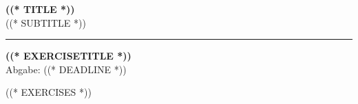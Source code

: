 \documentclass[11pt,a4paper]{article}
\begin{document}
\pagestyle{empty}

\mbox{}\vspace{-1.8cm}
\noindent    

{\Large\bfseries
((* TITLE *))}\\
((* SUBTITLE *))
\vspace{2mm}
\hrule
\vspace{5mm}
\begin{center}
	{\large\bfseries ((* EXERCISETITLE *))}\\
	\vspace{2mm}
	{Abgabe: ((* DEADLINE *))}
\end{center}
\bigskip

((* EXERCISES *))
\end{document}
